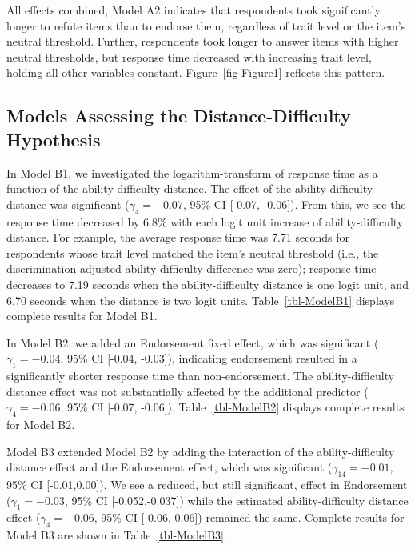 \documentclass[
  number]{elsarticle}
\begin{document}
All effects combined, Model A2 indicates that respondents took
significantly longer to refute items than to endorse them, regardless of
trait level or the item's neutral threshold. Further, respondents took
longer to answer items with higher neutral thresholds, but response time
decreased with increasing trait level, holding all other variables
constant. Figure~\ref{fig-Figure1} reflects this pattern.

\subsection{Models Assessing the Distance-Difficulty
Hypothesis}\label{models-assessing-the-distance-difficulty-hypothesis}

In Model B1, we investigated the logarithm-transform of response time as
a function of the ability-difficulty distance. The effect of the
ability-difficulty distance was significant (\(γ_4=-0.07\), 95\% CI
{[}-0.07, -0.06{]}). From this, we see the response time decreased by
6.8\% with each logit unit increase of ability-difficulty distance. For
example, the average response time was 7.71 seconds for respondents
whose trait level matched the item's neutral threshold (i.e., the
discrimination-adjusted ability-difficulty difference was zero);
response time decreases to 7.19 seconds when the ability-difficulty
distance is one logit unit, and 6.70 seconds when the distance is two
logit units. Table~\ref{tbl-ModelB1} displays complete results for Model
B1.

In Model B2, we added an Endorsement fixed effect, which was significant
(\(γ_1=-0.04\), 95\% CI {[}-0.04, -0.03{]}), indicating endorsement
resulted in a significantly shorter response time than non-endorsement.
The ability-difficulty distance effect was not substantially affected by
the additional predictor (\(γ_4=-0.06\), 95\% CI {[}-0.07, -0.06{]}).
Table~\ref{tbl-ModelB2} displays complete results for Model B2.

Model B3 extended Model B2 by adding the interaction of the
ability-difficulty distance effect and the Endorsement effect, which was
significant (\(γ_{14}=-0.01\), 95\% CI {[}-0.01,0.00{]}). We see a
reduced, but still significant, effect in Endorsement (\(γ_1=-0.03\),
95\% CI {[}-0.052,-0.037{]}) while the estimated ability-difficulty
distance effect (\(γ_4=-0.06\), 95\% CI {[}-0.06,-0.06{]}) remained the
same. Complete results for Model B3 are shown in
Table~\ref{tbl-ModelB3}.
\end{document}
